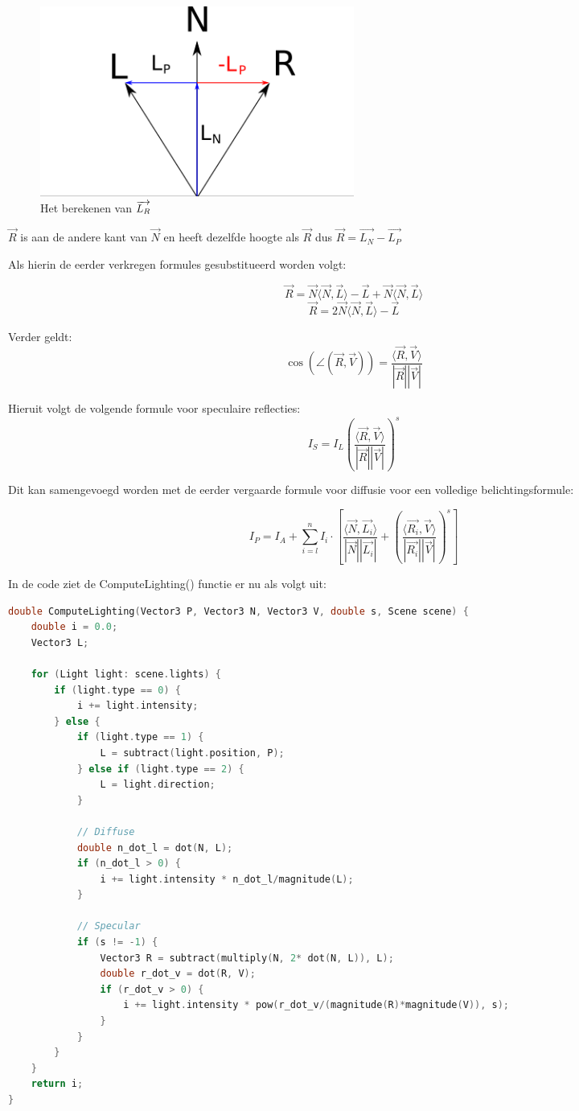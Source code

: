 \documentclass[12pt, a4paper]{article}
\newcommand*{\ora}{\overrightarrow}
\begin{document}
\begin{figure}[H]
    \centering
    \includegraphics[width=0.50\textwidth]{LR_Calculation.png}
    \caption{Het berekenen van $\protect\ora{L_R}$}
    \label{fig:LR_Calculation}
\end{figure}

$\ora{R}$ is aan de andere kant van $\ora{N}$ en heeft dezelfde hoogte als $\ora{R}$ dus $\ora{R}=\ora{L_N}-\ora{L_P}$

Als hierin de eerder verkregen formules gesubstitueerd worden volgt:

\[\ora{R}=\ora{N}\langle\ora{N},\ora{L}\rangle-\ora{L}+\ora{N}\langle\ora{N},\ora{L}\rangle\]
\[\ora{R}=2\ora{N}\langle\ora{N},\ora{L}\rangle-\ora{L}\]

Verder geldt:
\[\cos\left(\angle\left(\ora{R}, \ora{V}\right)\right)=\frac{\langle\ora{R},\ora{V}\rangle}{\left|\ora{R}\right|\left|\ora{V}\right|}\]

Hieruit volgt de volgende formule voor speculaire reflecties:
\[I_S=I_L\left(\frac{\langle\ora{R},\ora{V}\rangle}{\left|\ora{R}\right|\left|\ora{V}\right|}\right)^s\]

Dit kan samengevoegd worden met de eerder vergaarde formule voor diffusie voor een volledige belichtingsformule:

\[
I_P=
I_A+
\sum_{i=l}^{n}I_i\cdot\left[
\frac{\langle \overrightarrow{N}, \overrightarrow{L_i} \rangle}{|\overrightarrow{N}||\overrightarrow{L_i}|}+
\left(\frac{\langle\ora{R_i},\ora{V}\rangle}{\left|\ora{R_i}\right|\left|\ora{V}\right|}\right)^s\right]
\]

In de code ziet de ComputeLighting() functie er nu als volgt uit:

\begin{lstlisting}[language=C++]
double ComputeLighting(Vector3 P, Vector3 N, Vector3 V, double s, Scene scene) {
    double i = 0.0;
    Vector3 L;

    for (Light light: scene.lights) {
        if (light.type == 0) {
            i += light.intensity;
        } else {
            if (light.type == 1) {
                L = subtract(light.position, P);
            } else if (light.type == 2) {
                L = light.direction;
            }

            // Diffuse
            double n_dot_l = dot(N, L);
            if (n_dot_l > 0) {
                i += light.intensity * n_dot_l/magnitude(L);
            }

            // Specular
            if (s != -1) {
                Vector3 R = subtract(multiply(N, 2* dot(N, L)), L);
                double r_dot_v = dot(R, V);
                if (r_dot_v > 0) {
                    i += light.intensity * pow(r_dot_v/(magnitude(R)*magnitude(V)), s);
                }
            }
        }
    }
    return i;
}
\end{lstlisting}
\end{document}
